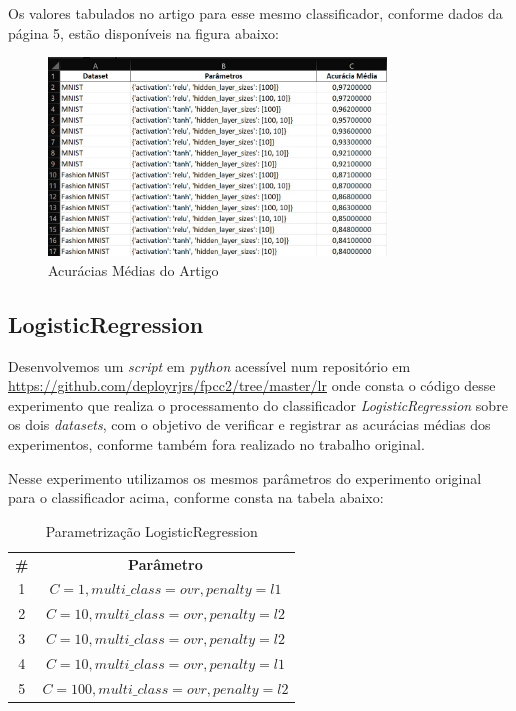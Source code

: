 \documentclass{article}
\begin{document}
Os valores tabulados no artigo para esse mesmo classificador, conforme dados da página 5, estão disponíveis na figura abaixo:
\begin{figure}[H]
    \centering
    \includegraphics[width=0.8\textwidth]{mlpplan02.jpg}
    \caption{Acurácias Médias do Artigo}
    \label{fig:planm2}
\end{figure}


\subsection{LogisticRegression}

Desenvolvemos um \textit{script} em \textit{python} acessível num repositório  em \url{https://github.com/deployrjrs/fpcc2/tree/master/lr} onde consta o código desse experimento que realiza o processamento do classificador \textit{LogisticRegression} sobre os dois \textit{datasets}, com o objetivo de verificar e registrar as acurácias médias dos experimentos, conforme também fora realizado no trabalho original. 

Nesse experimento utilizamos os mesmos parâmetros do experimento original para o classificador acima, conforme consta na tabela abaixo:
\begin{table}[h]
\centering
\begin{tabular}{cc}
    \toprule
    \midrule
    \textbf{\#} & \textbf{Parâmetro} \\
    1 & $C=1, multi\_class=ovr, penalty=l1$   \\
    2 & $C=10, multi\_class=ovr, penalty=l2$  \\
    3 & $C=10, multi\_class=ovr, penalty=l2$  \\
    4 & $C=10, multi\_class=ovr, penalty=l1$ \\
    5 & $C=100, multi\_class=ovr, penalty=l2$ \\
\bottomrule
\end{tabular}
\caption{Parametrização LogisticRegression}
\label{tab:tabela3}
\end{table}
\end{document}
